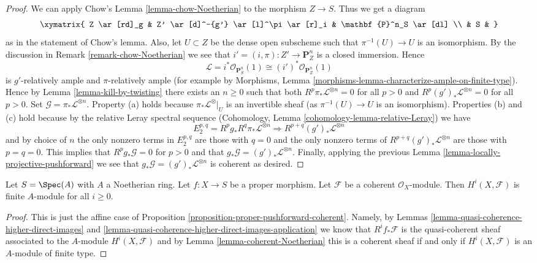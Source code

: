 \begin{proof}
\medskip\noindent
We can apply Chow's Lemma \ref{lemma-chow-Noetherian}
to the morphism $Z \to S$. Thus we get a diagram
$$
\xymatrix{
Z \ar[rd]_g & Z' \ar[d]^-{g'} \ar[l]^\pi \ar[r]_i & \mathbf{P}^n_S \ar[dl] \\
& S &
}
$$
as in the statement of Chow's lemma. Also, let $U \subset Z$ be
the dense open subscheme such that $\pi^{-1}(U) \to U$ is an isomorphism.
By the discussion in Remark \ref{remark-chow-Noetherian} we see that
$i' = (i, \pi) : Z' \to \mathbf{P}^n_Z$ is
a closed immersion. Hence
$$
\mathcal{L} = i^*\mathcal{O}_{\mathbf{P}^n_S}(1) \cong
(i')^*\mathcal{O}_{\mathbf{P}^n_Z}(1)
$$
is $g'$-relatively ample and $\pi$-relatively ample (for example by
Morphisms, Lemma \ref{morphisms-lemma-characterize-ample-on-finite-type}).
Hence by Lemma \ref{lemma-kill-by-twisting}
there exists an $n \geq 0$ such that
both $R^p\pi_*\mathcal{L}^{\otimes n} = 0$ for all $p > 0$ and
$R^p(g')_*\mathcal{L}^{\otimes n} = 0$ for all $p > 0$.
Set $\mathcal{G} = \pi_*\mathcal{L}^{\otimes n}$.
Property (a) holds because $\pi_*\mathcal{L}^{\otimes}|_U$ is
an invertible sheaf (as $\pi^{-1}(U) \to U$ is an isomorphism).
Properties (b) and (c) hold because by the relative Leray
spectral sequence
(Cohomology, Lemma \ref{cohomology-lemma-relative-Leray})
we have
$$
E_2^{p, q} = R^pg_* R^q\pi_*\mathcal{L}^{\otimes n}
\Rightarrow
R^{p + q}(g')_*\mathcal{L}^{\otimes n}
$$
and by choice of $n$ the only nonzero terms in $E_2^{p, q}$ are
those with $q = 0$ and the only nonzero terms of
$R^{p + q}(g')_*\mathcal{L}^{\otimes n}$ are those with $p = q = 0$.
This implies that $R^pg_*\mathcal{G} = 0$ for $p > 0$ and
that $g_*\mathcal{G} = (g')_*\mathcal{L}^{\otimes n}$.
Finally, applying the previous
Lemma \ref{lemma-locally-projective-pushforward}
we see that $g_*\mathcal{G} = (g')_*\mathcal{L}^{\otimes n}$ is
coherent as desired.
\end{proof}

\begin{lemma}
\label{lemma-proper-over-affine-cohomology-finite}
Let $S = \Spec(A)$ with $A$ a Noetherian ring.
Let $f : X \to S$ be a proper morphism.
Let $\mathcal{F}$ be a coherent $\mathcal{O}_X$-module.
Then $H^i(X, \mathcal{F})$ is finite $A$-module for all $i \geq 0$.
\end{lemma}

\begin{proof}
This is just the affine case of
Proposition \ref{proposition-proper-pushforward-coherent}.
Namely, by Lemmas \ref{lemma-quasi-coherence-higher-direct-images} and
\ref{lemma-quasi-coherence-higher-direct-images-application} we know that
$R^if_*\mathcal{F}$ is the quasi-coherent sheaf associated
to the $A$-module $H^i(X, \mathcal{F})$
and by Lemma \ref{lemma-coherent-Noetherian} this is
a coherent sheaf if and only if $H^i(X, \mathcal{F})$
is an $A$-module of finite type.
\end{proof}

